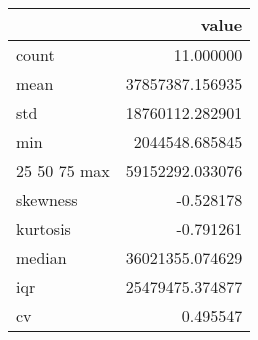 \begin{tabular}{lr}
\toprule
 & value \\
\midrule
count & 11.000000 \\
mean & 37857387.156935 \\
std & 18760112.282901 \\
min & 2044548.685845 \\
25%
50%
75%
max & 59152292.033076 \\
skewness & -0.528178 \\
kurtosis & -0.791261 \\
median & 36021355.074629 \\
iqr & 25479475.374877 \\
cv & 0.495547 \\
\bottomrule
\end{tabular}
